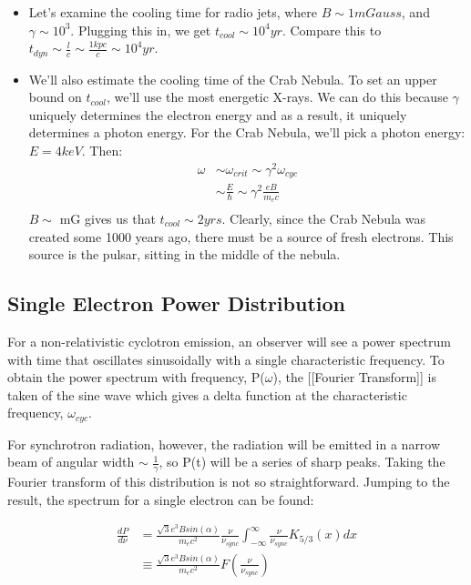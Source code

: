 \documentclass{article}
\begin{document}
\begin{itemize}
\item Let's examine the cooling time for radio jets, 
where $B\sim1mGauss$, 
and $\gamma\sim10^3$.  Plugging this in, we get $t_{cool}\sim10^4yr$.  Compare
this to $t_{dyn}\sim\frac{l}{ c}\sim\frac{1kpc}{ c}\sim10^4yr$.

\item We'll also estimate the cooling time of the Crab Nebula.  To set
an upper bound on $t_{cool}$, we'll use the most energetic X-rays.  We can
do this because $\gamma$ uniquely determines the electron energy and as a 
result, it uniquely determines a photon energy.  For the Crab Nebula, we'll
pick a photon energy: $E=4keV$.  Then:
$$\begin{aligned}\omega&\sim\omega_{crit}\sim\gamma^2\omega_{cyc}\\ 
&\sim\frac{E}{\hbar}\sim\gamma^2\frac{eB}{ m_ec}\\ \end{aligned}$$
$B \sim$ mG gives us that $t_{cool}\sim 2 yrs$.  Clearly, since the Crab Nebula
was created some 1000 years ago, there must be a source of fresh electrons.
This source is the pulsar, sitting in the middle of the nebula.
\end{itemize}

\subsection{Single Electron Power Distribution}

For a non-relativistic cyclotron emission, an observer will see a power spectrum with time that oscillates sinusoidally with a single characteristic frequency. To obtain the power spectrum with frequency, P($\omega$), the [[Fourier Transform]] is taken of the sine wave which gives a delta function at the characteristic frequency, $\omega_{cyc}$.  

For synchrotron radiation, however, the radiation will be emitted in a narrow beam of angular width $\sim$ $\frac{1}{\gamma}$, so P(t) will be a series of sharp peaks.  Taking the Fourier transform of this distribution is not so straightforward.  Jumping to the result, the spectrum for a single electron can be found:

 $$\begin{aligned}
\frac{dP}{d\nu} &=  \frac{\sqrt{3}e^3 B sin(\alpha)}{m_e c^2}\frac{\nu}{\nu_{sync}} \int_{-\infty}^{\infty}{\frac{\nu}{\nu_{sync}}K_{5/3}(x)dx}\\
 &\equiv \frac{\sqrt{3}e^3 B sin(\alpha)}{m_e c^2} F\left(\frac{\nu}{\nu_{sync}}\right) 
\end{aligned}$$
\end{document}
